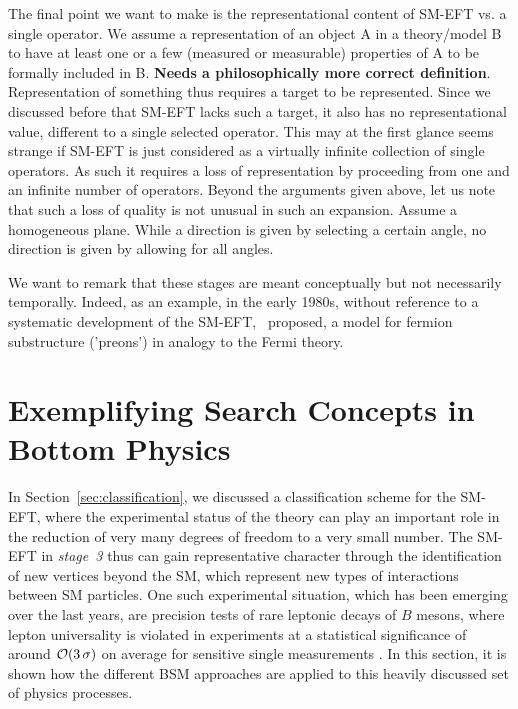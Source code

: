 The final point we want to make is the representational content of SM-EFT vs. a single
operator.
We assume a representation of an object A in a theory/model B to have at least one 
or a few (measured or measurable) properties of A to be formally included in B.
\textbf{Needs a philosophically more correct definition}.
Representation of something thus requires a target to be represented.
Since we discussed before that SM-EFT lacks such a target, it also has no representational
value, different to a single selected operator.
This may at the first glance seems strange if SM-EFT is just considered as a virtually
infinite collection of single operators. 
As such it requires a loss of representation by proceeding from one and an infinite number of operators.
Beyond the arguments given above, let us note that such a loss of quality is not unusual
in such an expansion.
Assume a homogeneous plane. 
While a direction is given by selecting a certain angle, no direction is given by allowing for
all angles.

We want to remark that these stages are meant conceptually but not necessarily temporally.
Indeed, as an example, in the early 1980s, without reference to
a systematic development of the SM-EFT,~\citep{Eichten:1983hw} proposed,
a model for fermion substructure ('preons') in analogy to the Fermi theory.

\section{Exemplifying Search Concepts in Bottom Physics}\label{sec:BphysicsConcepts}

In Section~\ref{sec:classification}, we discussed a classification
scheme for the SM-EFT, where the experimental status of the theory can
play an important role in the reduction of very many degrees of
freedom to a very small number. The SM-EFT in \emph{stage~3} thus can
gain representative character through the identification of new
vertices beyond the SM, which represent new types of interactions
between SM particles. One such experimental situation, which has been
emerging over the last years, are precision tests of rare leptonic
decays of $B$ mesons, where lepton universality is
violated in experiments
at a statistical significance of around ${\cal O}(3\,\sigma)$ on
average for sensitive single measurements \citep{Aaij:2015oid,Aaij:2017vbb,Aaij:2019wad,Abdesselam:2019dgh,Abdesselam:2019wac,Buttazzo:2017ixm}.
In this section, it is shown how the different BSM approaches are applied to this heavily discussed set of physics processes.

